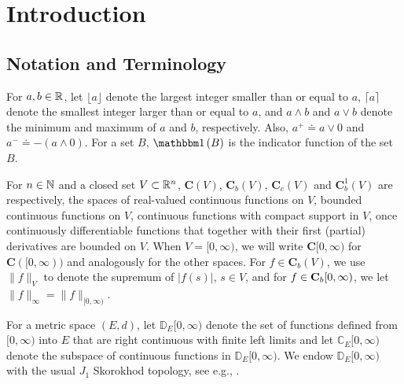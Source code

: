 \documentclass{article}
\begin{document}


\tableofcontents


\section{Introduction}\label{sec_intro}

\subsection{Notation and Terminology} \label{sec_notation}
For $a, b \in \mathbb{R}$, let $\lfloor a\rfloor$ denote the largest integer smaller than or equal to $a$, $\lceil a\rceil$ denote the smallest integer larger than or equal to $a$, and   $a \wedge b$ and $a \vee b$ denote the minimum and maximum of $a$ and $b$, respectively. Also,  $a^+\doteq a\vee 0$ and $a^-\doteq-(a\wedge 0)$. For a set $B$, $\indic{B}$ is the indicator function of the set $B$.

For  $n\in\mathbb{N}$ and  a closed set $V\subset\mathbb{R}^n$, $\mathbf{C}(V)$, $\mathbf{C}_b(V)$, $\mathbf{C}_c(V)$ and $\mathbf{C}^1_b(V)$  are respectively, the spaces of real-valued continuous functions on $V$, bounded continuous functions on $V$,  continuous functions with compact support in $V$, once continuously differentiable functions that together with their first (partial) derivatives are
bounded on $V$. When $V = [0,\infty)$, we will write $\mathbf{C}[0,\infty)$ for $\mathbf{C}([0,\infty))$ and analogously for the other spaces. For $f\in \mathbf{C}_b(V)$, we use $\|f\|_V$ to denote the supremum of $|f(s)|$, $s \in V$, and for $f\in\mathbf{C}_b[0,\infty)$, we let $\|f\|_\infty=\|f\|_{[0,\infty)} $. 

For a metric space $(E, d)$, let $\mathbb D_E[0,\infty)$ denote the set of functions defined from $[0,\infty)$ into $E$ that are right continuous with finite left limits
and let $\mathbb C_E[0,\infty)$ denote the subspace of continuous functions in $\mathbb D_E [0, \infty)$. We endow $\mathbb D_E [0,\infty)$ with the usual $J_1$ Skorokhod topology,
see e.g., \cite{KurtzBook}.

\end{document}

